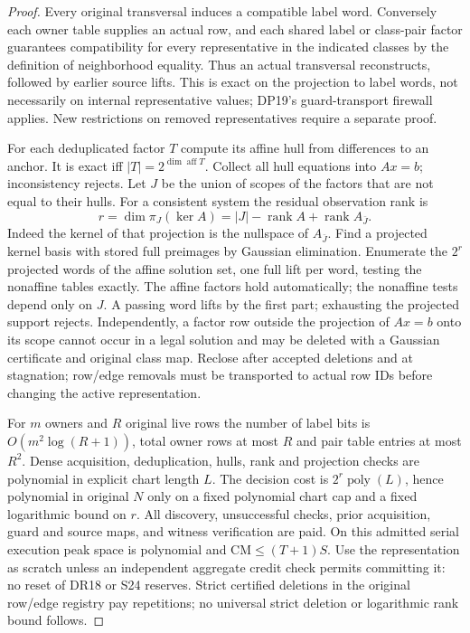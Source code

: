 \documentclass[11pt]{article}
\begin{document}
\begin{proof}
Every original transversal induces a compatible label word. Conversely each owner table supplies an actual row, and each shared label or class-pair factor guarantees compatibility for every representative in the indicated classes by the definition of neighborhood equality. Thus an actual transversal reconstructs, followed by earlier source lifts. This is exact on the projection to label words, not necessarily on internal representative values; DP19's guard-transport firewall applies. New restrictions on removed representatives require a separate proof.

For each deduplicated factor $T$ compute its affine hull from differences to an anchor. It is exact iff $|T|=2^{\dim\operatorname{aff}T}$. Collect all hull equations into $Ax=b$; inconsistency rejects. Let $J$ be the union of scopes of the factors that are not equal to their hulls. For a consistent system the residual observation rank is
\[
 r=\dim\pi_J(\ker A)=|J|-\operatorname{rank}A+\operatorname{rank} A_{\bar J}.
\]
Indeed the kernel of that projection is the nullspace of $A_{\bar J}$. Find a projected kernel basis with stored full preimages by Gaussian elimination. Enumerate the $2^r$ projected words of the affine solution set, one full lift per word, testing the nonaffine tables exactly. The affine factors hold automatically; the nonaffine tests depend only on $J$. A passing word lifts by the first part; exhausting the projected support rejects. Independently, a factor row outside the projection of $Ax=b$ onto its scope cannot occur in a legal solution and may be deleted with a Gaussian certificate and original class map. Reclose after accepted deletions and at stagnation; row/edge removals must be transported to actual row IDs before changing the active representation.

For $m$ owners and $R$ original live rows the number of label bits is $O(m^2\log(R+1))$, total owner rows at most $R$ and pair table entries at most $R^2$. Dense acquisition, deduplication, hulls, rank and projection checks are polynomial in explicit chart length $L$. The decision cost is $2^r\operatorname{poly}(L)$, hence polynomial in original $N$ only on a fixed polynomial chart cap and a fixed logarithmic bound on $r$. All discovery, unsuccessful checks, prior acquisition, guard and source maps, and witness verification are paid. On this admitted serial execution peak space is polynomial and $\mathrm{CM}\le(T+1)S$. Use the representation as scratch unless an independent aggregate credit check permits committing it: no reset of DR18 or S24 reserves. Strict certified deletions in the original row/edge registry pay repetitions; no universal strict deletion or logarithmic rank bound follows.
\end{proof}
\end{document}
